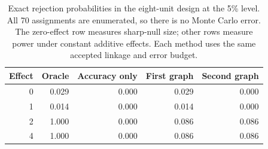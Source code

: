 \begin{table}[htbp]\centering
\caption{Exact rejection probabilities in the eight-unit design at the 5\% level.
All 70 assignments are enumerated, so there is no Monte Carlo error.
The zero-effect row measures sharp-null size; other rows measure power under constant
additive effects. Each method uses the same accepted linkage and error budget.}
\label{tab:design}
\begin{tabular}{rrrrr}\toprule
Effect & Oracle & Accuracy only & First graph & Second graph \\
\midrule
0 & 0.029 & 0.000 & 0.029 & 0.000 \\
1 & 0.014 & 0.000 & 0.014 & 0.000 \\
2 & 1.000 & 0.000 & 0.086 & 0.086 \\
4 & 1.000 & 0.000 & 0.086 & 0.086 \\
\bottomrule\end{tabular}\end{table}
